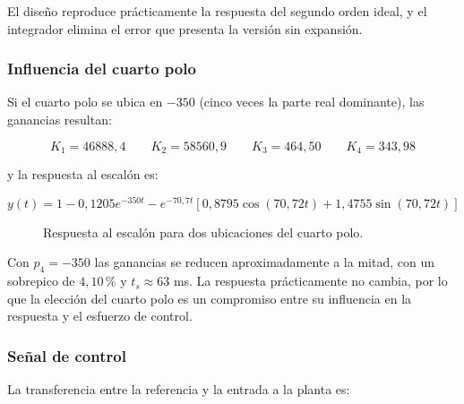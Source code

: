 \documentclass[12pt,a4paper]{article}
\begin{document}
El diseño reproduce prácticamente la respuesta del segundo orden ideal, y el integrador elimina el error que presenta la versión sin expansión.
\subsubsection*{Influencia del cuarto polo}
Si el cuarto polo se ubica en $-350$ (cinco veces la parte real dominante), las ganancias resultan:

\begin{equation}K_1=46888{,}4 \qquad K_2=58560{,}9 \qquad K_3=464{,}50 \qquad K_4=343{,}98\end{equation}

y la respuesta al escalón es:

\begin{equation}y(t)=1-0{,}1205e^{-350t}-e^{-70{,}7t}\left[0{,}8795\cos(70{,}72t)+1{,}4755\sin(70{,}72t)\right]\end{equation}

\begin{figure}[H]\centering{}\caption{Respuesta al escalón para dos ubicaciones del cuarto polo.}\end{figure}

Con $p_4=-350$ las ganancias se reducen aproximadamente a la mitad, con un sobrepico de $4{,}10\,\text{\%}$ y $t_s\approx63$ ms. La respuesta prácticamente no cambia, por lo que la elección del cuarto polo es un compromiso entre su influencia en la respuesta y el esfuerzo de control.
\subsubsection*{Señal de control}
La transferencia entre la referencia y la entrada a la planta es:
\end{document}
